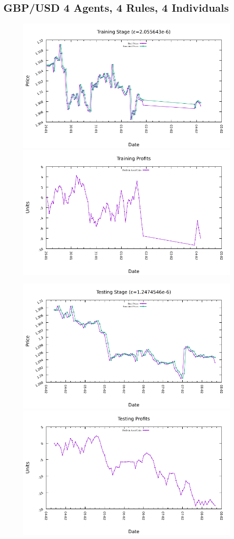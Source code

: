 





\subsection{GBP/USD 4 Agents, 4 Rules, 4 Individuals}
\label{results:forecast-gbp-usd-4agents-4rules-4individuals}

\begin{figure}[htp]
\centering

\includegraphics[width=.45\textwidth]{img/plots/gbp_usd_h1-4agents-4rules-4ind-100gen_training_fit.pdf}\quad
\includegraphics[width=.45\textwidth]{img/plots/gbp_usd_h1-4agents-4rules-4ind-100gen_training_profits.pdf}

\medskip

\includegraphics[width=.45\textwidth]{img/plots/gbp_usd_h1-4agents-4rules-4ind-100gen_testing_fit.pdf}\quad
\includegraphics[width=.45\textwidth]{img/plots/gbp_usd_h1-4agents-4rules-4ind-100gen_testing_profits.pdf}


\end{figure}
